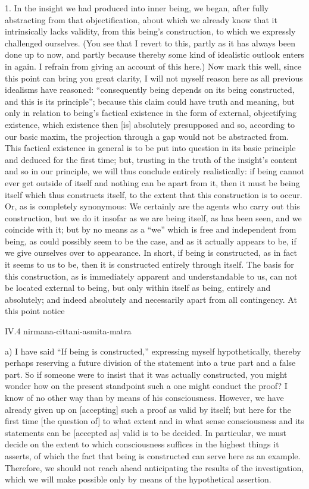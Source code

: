 1. In the insight we had produced into inner being,
we began, after fully abstracting from that objectification,
about which we already know that it intrinsically lacks validity,
from this being's construction,
to which we expressly challenged ourselves.
(You see that I revert to this,
partly as it has always been done up to now,
and partly because thereby some kind of
idealistic outlook enters in again.
I refrain from giving an account of this here.)
Now mark this well, since this point can bring you great clarity,
I will not myself reason here as all previous idealisms have reasoned:
“consequently being depends on its being constructed,
and this is its principle”;
because this claim could have truth and meaning,
but only in relation to being's factical existence
in the form of external, objectifying existence,
which existence then [is] absolutely presupposed
and so, according to our basic maxim,
the projection through a gap would not be abstracted from.
This factical existence in general is to be put into question
in its basic principle and deduced for the first time;
but, trusting in the truth of the insight's content
and so in our principle,
we will thus conclude entirely realistically:
if being cannot ever get outside of itself
and nothing can be apart from it,
then it must be being itself
which thus constructs itself,
to the extent that this construction is to occur.
Or, as is completely synonymous:
We certainly are the agents who carry out this construction,
but we do it insofar as we are being itself,
as has been seen, and we coincide with it;
but by no means as a “we” which
is free and independent from being,
as could possibly seem to be the case,
and as it actually appears to be,
if we give ourselves over to appearance.
In short, if being is constructed,
as in fact it seems to us to be,
then it is constructed entirely through itself.
The basis for this construction,
as is immediately apparent and understandable to us,
can not be located external to being,
but only within itself as being, entirely and absolutely;
and indeed absolutely and necessarily
apart from all contingency.
At this point notice

IV.4
nirmana-cittani-asmita-matra

a) I have said “If being is constructed,”
expressing myself hypothetically,
thereby perhaps reserving a future division
of the statement into a true part and a false part.
So if someone were to insist that it was actually constructed,
you might wonder how on the present standpoint
such a one might conduct the proof?
I know of no other way than by means of his consciousness.
However, we have already given up on [accepting]
such a proof as valid by itself;
but here for the first time [the question of]
to what extent and in what sense
consciousness and its statements
can be [accepted as] valid is to be decided.
In particular, we must decide on the extent
to which consciousness suffices
in the highest things it asserts,
of which the fact that being is constructed
can serve here as an example.
Therefore, we should not reach ahead
anticipating the results of the investigation,
which we will make possible only by means of
the hypothetical assertion.

